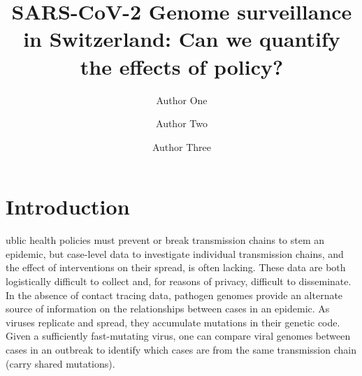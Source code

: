 \documentclass[9pt,twocolumn,twoside,lineno]{pnas-new}
\title{SARS-CoV-2 Genome surveillance in Switzerland: Can we quantify the effects of policy?}
\author[a,c,1]{Author One}
\author[b,1,2]{Author Two}
\author[a]{Author Three}
\affil[a]{Affiliation One}
\affil[b]{Affiliation Two}
\affil[c]{Affiliation Three}
\begin{document}
\maketitle
\thispagestyle{firststyle}



\section{Introduction}

ublic health policies must prevent or break transmission chains to stem an epidemic, but case-level data to investigate individual transmission chains, and the effect of interventions on their spread, is often lacking. These data are both logistically difficult to collect and, for reasons of privacy, difficult to disseminate. In the absence of contact tracing data, pathogen genomes provide an alternate source of information on the relationships between cases in an epidemic. As viruses replicate and spread, they accumulate mutations in their genetic code. Given a sufficiently fast-mutating virus, one can compare viral genomes between cases in an outbreak to identify which cases are from the same transmission chain (carry shared mutations). 
\end{document}
